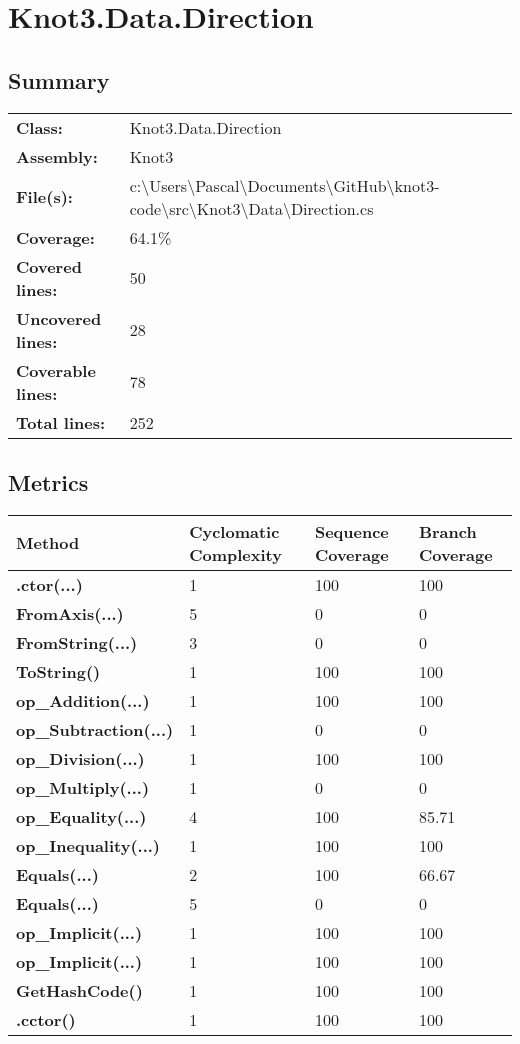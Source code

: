 \documentclass[a4paper,10pt]{article}
\begin{document}
\section{Knot3.Data.Direction}
\subsection{Summary}
\begin{longtable}[l]{ll}
\textbf{Class:} & Knot3.Data.Direction\\
\textbf{Assembly:} & Knot3\\
\textbf{File(s):} & \begin{minipage}[t]{12cm}{c:\textbackslash Users\textbackslash Pascal\textbackslash Documents\textbackslash GitHub\textbackslash knot3-code\textbackslash src\textbackslash Knot3\textbackslash Data\textbackslash Direction.cs}\end{minipage} \\
\textbf{Coverage:} & 64.1\%\\
\textbf{Covered lines:} & 50\\
\textbf{Uncovered lines:} & 28\\
\textbf{Coverable lines:} & 78\\
\textbf{Total lines:} & 252\\
\end{longtable}
\subsection{Metrics}
\begin{longtable}[l]{|l|l|l|l|}
\hline
\textbf{Method} & \textbf{Cyclomatic Complexity} & \textbf{Sequence Coverage} & \textbf{Branch Coverage}\\
\hline
\textbf{.ctor(...)} & 1 & 100 & 100\\
\hline
\textbf{FromAxis(...)} & 5 & 0 & 0\\
\hline
\textbf{FromString(...)} & 3 & 0 & 0\\
\hline
\textbf{ToString()} & 1 & 100 & 100\\
\hline
\textbf{op\_Addition(...)} & 1 & 100 & 100\\
\hline
\textbf{op\_Subtraction(...)} & 1 & 0 & 0\\
\hline
\textbf{op\_Division(...)} & 1 & 100 & 100\\
\hline
\textbf{op\_Multiply(...)} & 1 & 0 & 0\\
\hline
\textbf{op\_Equality(...)} & 4 & 100 & 85.71\\
\hline
\textbf{op\_Inequality(...)} & 1 & 100 & 100\\
\hline
\textbf{Equals(...)} & 2 & 100 & 66.67\\
\hline
\textbf{Equals(...)} & 5 & 0 & 0\\
\hline
\textbf{op\_Implicit(...)} & 1 & 100 & 100\\
\hline
\textbf{op\_Implicit(...)} & 1 & 100 & 100\\
\hline
\textbf{GetHashCode()} & 1 & 100 & 100\\
\hline
\textbf{.cctor()} & 1 & 100 & 100\\
\hline
\end{longtable}
\end{document}
